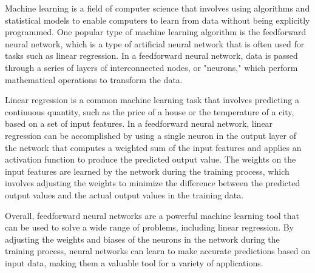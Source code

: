 \documentclass[a4paper, UKenglish, 11pt]{uiomaster}
\begin{document}
Machine learning is a field of computer science that involves using algorithms and statistical models to enable computers to learn from data without being explicitly programmed. One popular type of machine learning algorithm is the feedforward neural network, which is a type of artificial neural network that is often used for tasks such as linear regression. In a feedforward neural network, data is passed through a series of layers of interconnected nodes, or "neurons," which perform mathematical operations to transform the data.

Linear regression is a common machine learning task that involves predicting a continuous quantity, such as the price of a house or the temperature of a city, based on a set of input features. In a feedforward neural network, linear regression can be accomplished by using a single neuron in the output layer of the network that computes a weighted sum of the input features and applies an activation function to produce the predicted output value. The weights on the input features are learned by the network during the training process, which involves adjusting the weights to minimize the difference between the predicted output values and the actual output values in the training data.

Overall, feedforward neural networks are a powerful machine learning tool that can be used to solve a wide range of problems, including linear regression. By adjusting the weights and biases of the neurons in the network during the training process, neural networks can learn to make accurate predictions based on input data, making them a valuable tool for a variety of applications.

%
%
%
%




​
\end{document}
